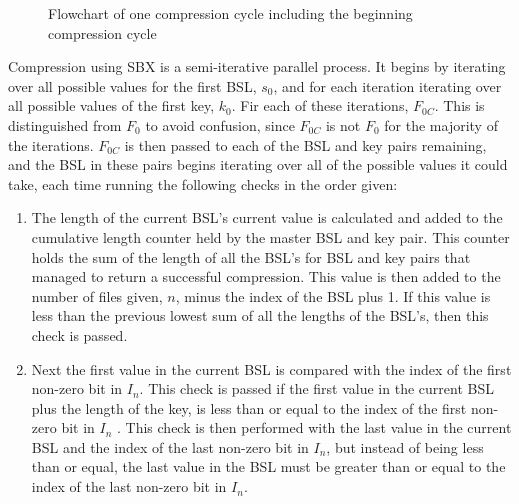 \documentclass[10pt]{article}
\begin{document}
\begin{figure}[h!]
{
    }
    \caption{Flowchart of one compression cycle including the beginning compression cycle}
    \label{fig:CompressionFlowchart}
\end{figure}

Compression using SBX is a semi-iterative parallel process. It begins by iterating over all possible values for the first BSL, $s_0$, and for each iteration iterating over all possible values of the first key, $k_0$. Fir each of these iterations, $F_{0C}$. This is distinguished from $F_0$ to avoid confusion, since $F_{0C}$ is not $F_0$ for the majority of the iterations. $F_{0C}$ is then passed to each of the BSL and key pairs remaining, and the BSL in these pairs begins iterating over all of the possible values it could take, each time running the following checks in the order given:
\begin{enumerate}
    \item The length of the current BSL's current value is calculated and added to the cumulative length counter held by the master BSL and key pair. This counter holds the sum of the length of all the BSL's for BSL and key pairs that managed to return a successful compression. This value is then added to the number of files given, $n$, minus the index of the BSL plus 1. If this value is less than the previous lowest sum of all the lengths of the BSL's, then this check is passed.
    \item Next the first value in the current BSL is compared with the index of the first non-zero bit in $I_n$. This check is passed if the first value in the current BSL plus the length of the key, is less than or equal to the index of the first non-zero bit in $I_n$ . This check is then performed with the last value in the current BSL and the index of the last non-zero bit in $I_n$, but instead of being less than or equal, the last value in the BSL must be greater than or equal to the index of the last non-zero bit in $I_n$.
\end{enumerate}
\end{document}
